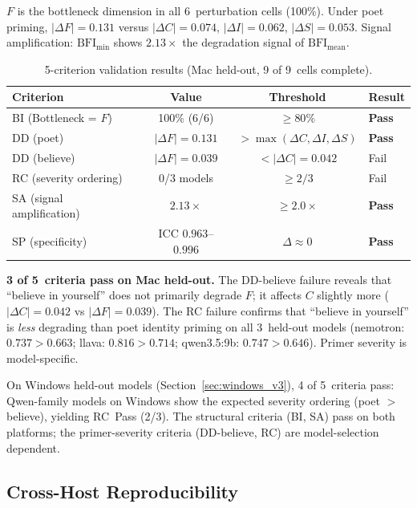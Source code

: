 \documentclass[11pt,a4paper]{article}
\begin{document}
$F$ is the bottleneck dimension in all 6~perturbation cells (100\%). Under poet priming, $|\Delta F| = 0.131$ versus $|\Delta C| = 0.074$, $|\Delta I| = 0.062$, $|\Delta S| = 0.053$. Signal amplification: $\text{BFI}_{\min}$ shows $2.13\times$ the degradation signal of $\text{BFI}_{\text{mean}}$.

\begin{table}[h]
\centering
\caption{5-criterion validation results (Mac held-out, 9 of 9~cells complete).}
\label{tab:criteria}
\begin{tabular}{lccl}
\toprule
Criterion & Value & Threshold & Result \\
\midrule
BI (Bottleneck = $F$) & 100\% (6/6) & $\geq 80\%$ & \textbf{Pass} \\
DD (poet) & $|\Delta F| = 0.131$ & $> \max(\Delta C, \Delta I, \Delta S)$ & \textbf{Pass} \\
DD (believe) & $|\Delta F| = 0.039$ & $< |\Delta C| = 0.042$ & Fail \\
RC (severity ordering) & 0/3 models & $\geq 2/3$ & Fail \\
SA (signal amplification) & $2.13\times$ & $\geq 2.0\times$ & \textbf{Pass} \\
SP (specificity) & ICC $0.963$--$0.996$ & $\Delta \approx 0$ & \textbf{Pass} \\
\bottomrule
\end{tabular}
\end{table}

\textbf{3 of 5~criteria pass on Mac held-out.} The DD-believe failure reveals that ``believe in yourself'' does not primarily degrade $F$; it affects $C$ slightly more ($|\Delta C| = 0.042$ vs $|\Delta F| = 0.039$). The RC failure confirms that ``believe in yourself'' is \emph{less} degrading than poet identity priming on all 3~held-out models (nemotron: $0.737 > 0.663$; llava: $0.816 > 0.714$; qwen3.5:9b: $0.747 > 0.646$). Primer severity is model-specific.

On Windows held-out models (Section~\ref{sec:windows_v3}), 4 of 5~criteria pass: Qwen-family models on Windows show the expected severity ordering (poet $>$ believe), yielding RC~Pass (2/3). The structural criteria (BI, SA) pass on both platforms; the primer-severity criteria (DD-believe, RC) are model-selection dependent.

\subsection{Cross-Host Reproducibility}
\end{document}
